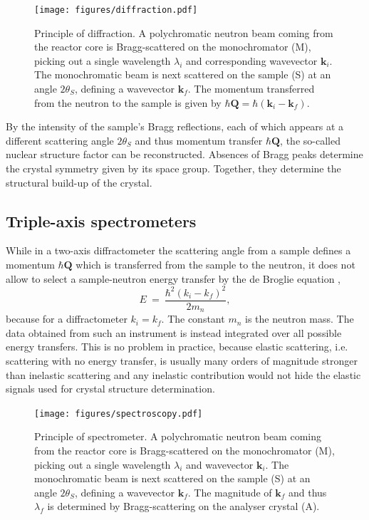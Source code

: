 \begin{figure}[htb]
	\centering
	\texttt{[image: figures/diffraction.pdf]}
	\caption{Principle of diffraction. A polychromatic neutron beam coming from the reactor core is Bragg-scattered on the monochromator (M), picking out a single wavelength $\lambda_i$ and corresponding wavevector $\bm{k}_i$. The monochromatic beam is next scattered on the sample (S) at an angle $2\theta_S$, defining a wavevector $\bm{k}_f$. The momentum transferred from the neutron to the sample is given by $\hbar \bm{Q} = \hbar \left( \bm{k}_i - \bm{k}_f \right)$.}
	\label{fig:diffraction}
\end{figure}

By the intensity of the sample's Bragg reflections, each of which appears at a different scattering angle $2\theta_S$ and thus momentum transfer $\hbar \bm{Q}$, the so-called nuclear structure factor can be reconstructed. Absences of Bragg peaks determine the crystal symmetry given by its space group. Together, they determine the structural build-up of the crystal.


\subsection{Triple-axis spectrometers}

While in a two-axis diffractometer the scattering angle from a sample defines a momentum $\hbar \bm{Q}$ which is transferred from the sample to the neutron, it does not allow to select a sample-neutron energy transfer by the de Broglie equation \cite[p. 89]{Gross2012},
\begin{equation}
	E \ =\  \frac{\hbar^2 \left(k_i - k_f\right)^2}{2 m_n},
\end{equation}
because for a diffractometer $k_i = k_f$. The constant $m_n$ is the neutron mass.
The data obtained from such an instrument is instead integrated over all possible energy transfers. This is no problem in practice, because elastic scattering, i.e. scattering with no energy transfer, is usually many orders of magnitude stronger than inelastic scattering and any inelastic contribution would not hide the elastic signals used for crystal structure determination.

\begin{figure}[htb]
	\centering
	\texttt{[image: figures/spectroscopy.pdf]}
	\caption{Principle of spectrometer. A polychromatic neutron beam coming from the reactor core is Bragg-scattered on the monochromator (M), picking out a single wavelength $\lambda_i$ and wavevector $\bm{k}_i$. The monochromatic beam is next scattered on the sample (S) at an angle $2\theta_S$, defining a wavevector $\bm{k}_f$. The magnitude of $\bm{k}_f$ and thus $\lambda_f$ is determined by Bragg-scattering on the analyser crystal (A). }
	\label{fig:spectroscopy}
\end{figure}



